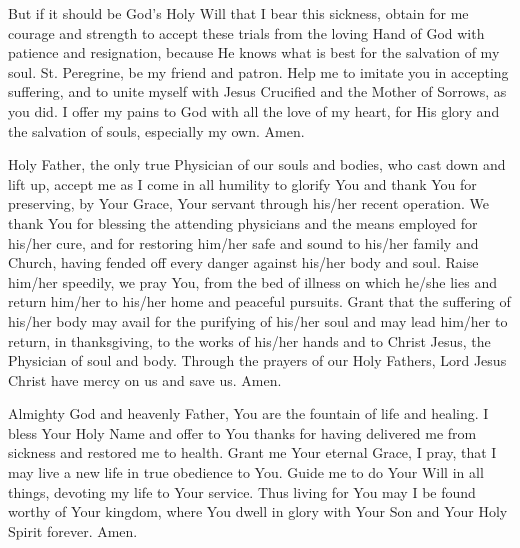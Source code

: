 But if it should be God's Holy Will that I bear this sickness, obtain for me courage and strength to accept these trials from the loving Hand of God with patience and resignation, because He knows what is best for the salvation of my soul.
St. Peregrine, be my friend and patron.
Help me to imitate you in accepting suffering, and to unite myself with Jesus Crucified and the Mother of Sorrows, as you did.
I offer my pains to God with all the love of my heart, for His glory and the salvation of souls, especially my own.
Amen.

Holy Father, the only true Physician of our souls and bodies, who cast down and lift up, accept me as I come in all humility to glorify You and thank You for preserving, by Your Grace, Your servant \insertname through his/her recent operation.
We thank You for blessing the attending physicians and the means employed for his/her cure, and for restoring him/her safe and sound to his/her family and Church, having fended off every danger against his/her body and soul.
Raise him/her speedily, we pray You, from the bed of illness on which he/she lies and return him/her to his/her home and peaceful pursuits.
Grant that the suffering of his/her body may avail for the purifying of his/her soul and may lead him/her to return, in thanksgiving, to the works of his/her hands and to Christ Jesus, the Physician of soul and body.
Through the prayers of our Holy Fathers, Lord Jesus Christ have mercy on us and save us.
Amen.

Almighty God and heavenly Father, You are the fountain of life and healing.
I bless Your Holy Name and offer to You thanks for having delivered me from sickness and restored me to health.
Grant me Your eternal Grace, I pray, that I may live a new life in true obedience to You.
Guide me to do Your Will in all things, devoting my life to Your service.
Thus living for You may I be found worthy of Your kingdom, where You dwell in glory with Your Son and Your Holy Spirit forever.
Amen.